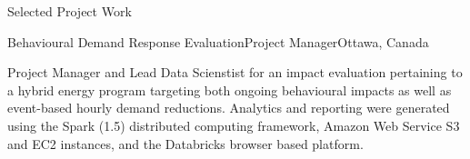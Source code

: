 \documentclass{resume} %
\begin{document}
\begin{rSection}{Selected Project Work}
\begin{rSubsection}{Behavioural Demand Response Evaluation}{}{Project Manager}{Ottawa, Canada}
\item[] Project Manager and Lead Data Scienstist for an impact evaluation pertaining to a hybrid energy program targeting both ongoing behavioural impacts as well as event-based hourly demand reductions. Analytics and reporting were generated using the Spark (1.5) distributed computing framework, Amazon Web Service S3 and EC2 instances, and the Databricks browser based platform.

\end{rSubsection}





\end{rSection}
\end{document}
